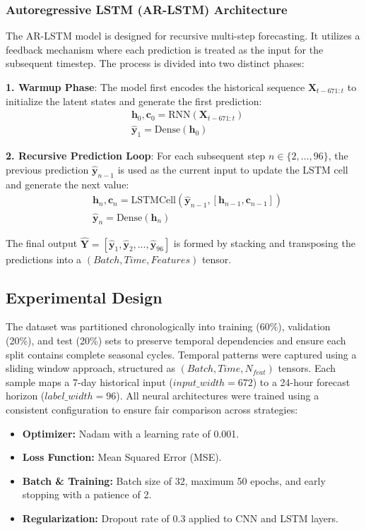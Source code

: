 \documentclass[conference]{IEEEtran}
\begin{document}
\subsubsection{\textbf{Autoregressive LSTM (AR-LSTM) Architecture}}
The AR-LSTM model is designed for recursive multi-step forecasting. It utilizes a feedback mechanism where each prediction is treated as the input for the subsequent timestep. The process is divided into two distinct phases:

\textbf{1. Warmup Phase}: The model first encodes the historical sequence $\mathbf{X}_{t-671:t}$ to initialize the latent states and generate the first prediction:
\begin{equation}
	\begin{split}
		&\mathbf{h}_0, \mathbf{c}_0 = \text{RNN}(\mathbf{X}_{t-671:t}) \\
		&\hat{\mathbf{y}}_1 = \text{Dense}(\mathbf{h}_0)
	\end{split}
\end{equation}

\textbf{2. Recursive Prediction Loop}: 
For each subsequent step $n \in \{2, \dots, 96\}$, the previous prediction $\hat{\mathbf{y}}_{n-1}$ is used as the current input to update the LSTM cell and generate the next value:
\begin{equation}
	\begin{split}
		&\mathbf{h}_n, \mathbf{c}_n = \text{LSTMCell}(\hat{\mathbf{y}}_{n-1}, [\mathbf{h}_{n-1}, \mathbf{c}_{n-1}]) \\
		&\hat{\mathbf{y}}_n = \text{Dense}(\mathbf{h}_n)
	\end{split}
\end{equation}

The final output $\hat{\mathbf{Y}} = [\hat{\mathbf{y}}_1, \hat{\mathbf{y}}_2, \dots, \hat{\mathbf{y}}_{96}]$ is formed by stacking and transposing the predictions into a $(Batch, Time, Features)$ tensor.

\subsection{Experimental Design}
The dataset was partitioned chronologically into training (60\%), validation (20\%), and test (20\%) sets to preserve temporal dependencies and ensure each split contains complete seasonal cycles. Temporal patterns were captured using a sliding window approach, structured as $(Batch, Time, N_{feat})$ tensors. Each sample maps a 7-day historical input ($input\_width=672$) to a 24-hour forecast horizon ($label\_width=96$). All neural architectures were trained using a consistent configuration to ensure fair comparison across strategies:
\begin{itemize}
	\item \textbf{Optimizer:} Nadam with a learning rate of 0.001.
	\item \textbf{Loss Function:} Mean Squared Error (MSE).
	\item \textbf{Batch \& Training:} Batch size of 32, maximum 50 epochs, and early stopping with a patience of 2.\item \textbf{Regularization:} Dropout rate of 0.3 applied to CNN and LSTM layers.
\end{itemize}
\end{document}
